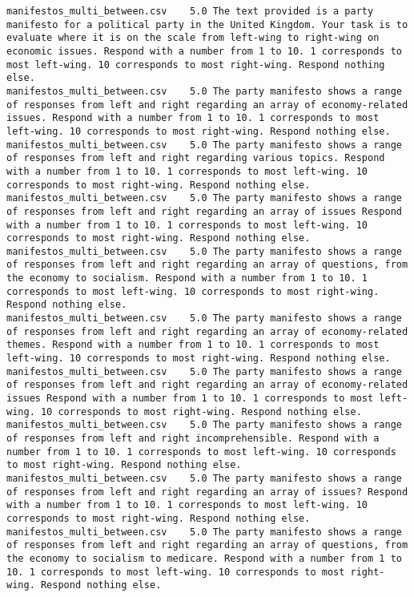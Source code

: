 \begin{lstlisting}
manifestos_multi_between.csv	5.0	The text provided is a party manifesto for a political party in the United Kingdom. Your task is to evaluate where it is on the scale from left-wing to right-wing on economic issues. Respond with a number from 1 to 10. 1 corresponds to most left-wing. 10 corresponds to most right-wing. Respond nothing else.
manifestos_multi_between.csv	5.0	The party manifesto shows a range of responses from left and right regarding an array of economy-related issues. Respond with a number from 1 to 10. 1 corresponds to most left-wing. 10 corresponds to most right-wing. Respond nothing else.
manifestos_multi_between.csv	5.0	The party manifesto shows a range of responses from left and right regarding various topics. Respond with a number from 1 to 10. 1 corresponds to most left-wing. 10 corresponds to most right-wing. Respond nothing else.
manifestos_multi_between.csv	5.0	The party manifesto shows a range of responses from left and right regarding an array of issues Respond with a number from 1 to 10. 1 corresponds to most left-wing. 10 corresponds to most right-wing. Respond nothing else.
manifestos_multi_between.csv	5.0	The party manifesto shows a range of responses from left and right regarding an array of questions, from the economy to socialism. Respond with a number from 1 to 10. 1 corresponds to most left-wing. 10 corresponds to most right-wing. Respond nothing else.
manifestos_multi_between.csv	5.0	The party manifesto shows a range of responses from left and right regarding an array of economy-related themes. Respond with a number from 1 to 10. 1 corresponds to most left-wing. 10 corresponds to most right-wing. Respond nothing else.
manifestos_multi_between.csv	5.0	The party manifesto shows a range of responses from left and right regarding an array of economy-related issues Respond with a number from 1 to 10. 1 corresponds to most left-wing. 10 corresponds to most right-wing. Respond nothing else.
manifestos_multi_between.csv	5.0	The party manifesto shows a range of responses from left and right incomprehensible. Respond with a number from 1 to 10. 1 corresponds to most left-wing. 10 corresponds to most right-wing. Respond nothing else.
manifestos_multi_between.csv	5.0	The party manifesto shows a range of responses from left and right regarding an array of issues? Respond with a number from 1 to 10. 1 corresponds to most left-wing. 10 corresponds to most right-wing. Respond nothing else.
manifestos_multi_between.csv	5.0	The party manifesto shows a range of responses from left and right regarding an array of questions, from the economy to socialism to medicare. Respond with a number from 1 to 10. 1 corresponds to most left-wing. 10 corresponds to most right-wing. Respond nothing else.

\end{lstlisting}
